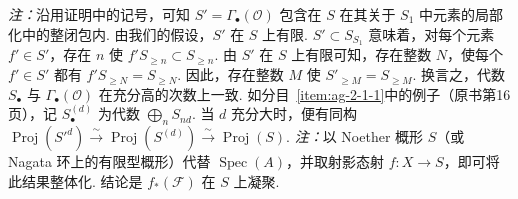 \emph{注：}沿用证明中的记号，可知 $S'=\Gamma_\bullet(\mathcal O)$ 包含在 $S$ 在其关于 $S_1$ 中元素的局部化中的整闭包内. 由我们的假设，$S'$ 在 $S$ 上有限. $S'\subset S_{S_1}$ 意味着，对每个元素 $f'\in S'$，存在 $n$ 使 $f'S_{\geqslant n}\subset S_{\geqslant n}$. 由 $S'$ 在 $S$ 上有限可知，存在整数 $N$，使每个 $f'\in S'$ 都有 $f'S_{\geqslant N}=S_{\geqslant N}$. 因此，存在整数 $M$ 使 $S'_{\geqslant M}=S_{\geqslant M}$. 换言之，代数 $S_\bullet$ 与 $\Gamma_\bullet(\mathcal O)$ 在充分高的次数上一致. 如分目~\ref{item:ag-2-1-1}中的例子（原书第16页），记 $S_\bullet^{(d)}$ 为代数 $\bigoplus_nS_{nd}$. 当 $d$ 充分大时，便有同构 $\operatorname{Proj}(S'^d)\xrightarrow\sim\operatorname{Proj}(S^{(d)})\xrightarrow\sim\operatorname{Proj}(S)$.
\emph{注：}以 Noether 概形 $S$（或 Nagata 环上的有限型概形）代替 $\operatorname{Spec}(A)$，并取射影态射 $f:X\longrightarrow S$，即可将此结果整体化. 结论是 $f_*(\mathcal F)$ 在 $S$ 上凝聚.
